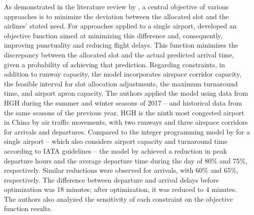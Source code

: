 As demonstrated in the literature review by , a central objective of various approaches is to minimize the deviation between the allocated slot and the airlines' stated need. For approaches applied to a single airport,  developed an objective function aimed at minimizing this difference and, consequently, improving punctuality and reducing flight delays. This function minimizes the discrepancy between the allocated slot and the actual predicted arrival time, given a probability of achieving that prediction. Regarding constraints, in addition to runway capacity, the model incorporates airspace corridor capacity, the feasible interval for slot allocation adjustments, the maximum turnaround time, and airport apron capacity. The authors applied the model using data from \acrfull{HGH} during the summer and winter seasons of 2017 – and historical data from the same seasons of the previous year. \acrshort{HGH} is the ninth most congested airport in China by air traffic movements, with two runways and three airspace corridors for arrivals and departures. Compared to the integer programming model by  for a single airport – which also considers airport capacity and turnaround time according to IATA guidelines – the model by  achieved a reduction in peak departure hours and the average departure time during the day of 80\% and 75\%, respectively. Similar reductions were observed for arrivals, with 60\% and 65\%, respectively. The difference between departure and arrival delays before optimization was 18 minutes; after optimization, it was reduced to 4 minutes. The authors also analyzed the sensitivity of each constraint on the objective function results.


